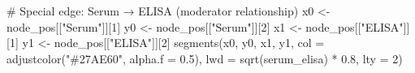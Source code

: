 \documentclass[
  letterpaper,
  DIV=11,
  numbers=noendperiod]{scrartcl}
\newenvironment{Shaded}{\begin{snugshade}}{\end{snugshade}}
\newcommand{\AttributeTok}[1]{\textcolor[rgb]{0.40,0.45,0.13}{#1}}
\newcommand{\CommentTok}[1]{\textcolor[rgb]{0.37,0.37,0.37}{#1}}
\newcommand{\DecValTok}[1]{\textcolor[rgb]{0.68,0.00,0.00}{#1}}
\newcommand{\FloatTok}[1]{\textcolor[rgb]{0.68,0.00,0.00}{#1}}
\newcommand{\FunctionTok}[1]{\textcolor[rgb]{0.28,0.35,0.67}{#1}}
\newcommand{\NormalTok}[1]{\textcolor[rgb]{0.00,0.23,0.31}{#1}}
\newcommand{\OtherTok}[1]{\textcolor[rgb]{0.00,0.23,0.31}{#1}}
\newcommand{\SpecialCharTok}[1]{\textcolor[rgb]{0.37,0.37,0.37}{#1}}
\newcommand{\StringTok}[1]{\textcolor[rgb]{0.13,0.47,0.30}{#1}}
\begin{document}
\begin{Shaded}
\begin{Highlighting}[]
\CommentTok{\# Special edge: Serum → ELISA (moderator relationship)}
\NormalTok{x0 }\OtherTok{\textless{}{-}}\NormalTok{ node\_pos[[}\StringTok{"Serum"}\NormalTok{]][}\DecValTok{1}\NormalTok{]}
\NormalTok{y0 }\OtherTok{\textless{}{-}}\NormalTok{ node\_pos[[}\StringTok{"Serum"}\NormalTok{]][}\DecValTok{2}\NormalTok{]}
\NormalTok{x1 }\OtherTok{\textless{}{-}}\NormalTok{ node\_pos[[}\StringTok{"ELISA"}\NormalTok{]][}\DecValTok{1}\NormalTok{]}
\NormalTok{y1 }\OtherTok{\textless{}{-}}\NormalTok{ node\_pos[[}\StringTok{"ELISA"}\NormalTok{]][}\DecValTok{2}\NormalTok{]}
\FunctionTok{segments}\NormalTok{(x0, y0, x1, y1,}
         \AttributeTok{col =} \FunctionTok{adjustcolor}\NormalTok{(}\StringTok{"\#27AE60"}\NormalTok{, }\AttributeTok{alpha.f =} \FloatTok{0.5}\NormalTok{), }\AttributeTok{lwd =} \FunctionTok{sqrt}\NormalTok{(serum\_elisa) }\SpecialCharTok{*} \FloatTok{0.8}\NormalTok{, }\AttributeTok{lty =} \DecValTok{2}\NormalTok{)}


\end{Highlighting}
\end{Shaded}
\end{document}
